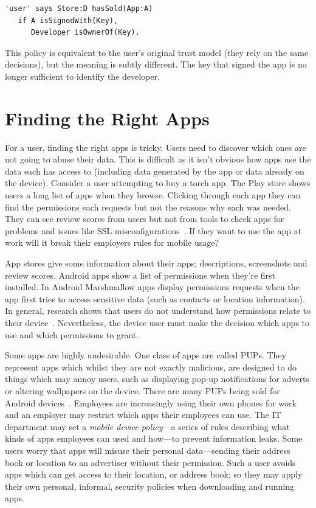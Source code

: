 \documentclass[thesis.tex]{subfiles}
\begin{document}
\begin{lstlisting}
'user' says Store:D hasSold(App:A)
   if A isSignedWith(Key),
      Developer isOwnerOf(Key).
\end{lstlisting}

This policy is equivalent to the user's original trust model (they rely on the
same decisions), but the meaning is subtly different. The key that signed the
app is no longer sufficient to identify the developer.

\section{Finding the Right Apps}

For a user, finding the right apps is tricky.  Users need to discover
which ones are not going to abuse their data.  This is difficult as it
isn't obvious how apps use the data each has access to (including data
generated by the app or data already on the device).  Consider a user
attempting to buy a torch app.  The Play store shows users a long
list of apps when they browse.  Clicking through each app they can
find the permissions each requests but not the reasons why each was
needed.  They can see review scores from users but not from tools to
check apps for problems and issues like SSL
misconfigurations~\cite{fahl_why_2012}.  If they want to use the app
at work will it break their employers rules for mobile usage?

App stores give some information about their apps; descriptions,
screenshots and review scores.  Android apps show a list of
permissions when they're first installed.  In Android Marshmallow apps
display permissions requests when the app first tries to access
sensitive data (such as contacts or location information).  In
general, research shows that users do not understand how permissions
relate to their device~\cite{felt_android_2012,thompson_when_2013}.
Nevertheless, the device user must make the decision which apps to use
and which permissions to grant.

Some apps are highly undesirable.  One class of apps are called
\acp{PUP}.  They represent apps which whilst they are not exactly
malicious, are designed to do things which may annoy users, such as
displaying pop-up notifications for adverts or altering wallpapers on
the device.  There are many \acp{PUP} being sold for Android
devices~\cite{truong_company_2014,vanja_svajcer_classifying_2013}.
Employees are increasingly using their own phones for work and an
employer may restrict which apps their employees can use.  The IT
department may set a \emph{mobile device policy}---a series of rules
describing what kinds of apps employees can used and how---to prevent
information leaks.  Some users worry that apps will misuse their
personal data---sending their address book or location to an advertiser
without their permission.  Such a user avoids apps which can get
access to their location, or address book; so they may apply their own
personal, informal, security policies when downloading and running
apps.
\end{document}
